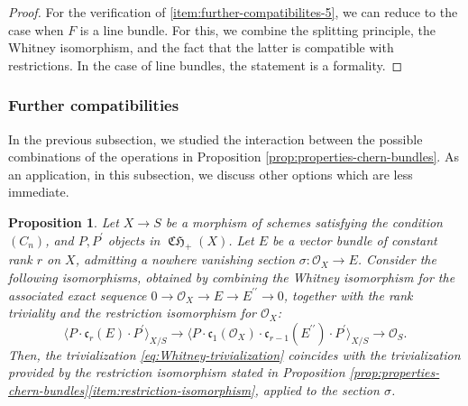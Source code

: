 \documentclass[11pt]{article}
\theoremstyle{plain}
\newtheorem{proposition}[theorem]{Proposition}
\theoremstyle{definition}
\newcommand{\Ocal}{\mathcal O}
\newcommand{\cfrak}{\mathfrak c}
\newcommand{\bis}{\prime\prime}
\DeclareMathOperator{\CHfrak}{\mathfrak{CH}}
\begin{document}
\begin{proof}
For the verification of \eqref{item:further-compatibilites-5}, we can reduce to the case when $F$ is a line bundle. For this, we combine the splitting principle, the Whitney isomorphism, and the fact that the latter is compatible with restrictions. In the case of line bundles, the statement is a formality.
\end{proof}

\subsubsection{Further compatibilities}

In the previous subsection, we studied the interaction between the possible combinations of the operations in Proposition \ref{prop:properties-chern-bundles}. As an application, in this subsection, we discuss other options which are less immediate.
\begin{proposition}\label{prop:newranktriviality}
Let $X\to S$ be a morphism of schemes satisfying the condition $(C_{n})$, and $P,P^{\prime}$ objects in $\CHfrak_{+}(X)$. Let $E$ be a vector bundle of constant rank $r$ on $X$, admitting a nowhere vanishing section $\sigma\colon\Ocal_{X}\to E$. Consider the following isomorphisms, obtained by combining the Whitney isomorphism for the associated exact sequence $0\to\Ocal_{X}\to E\to E^{\bis}\to 0$, together with the rank triviality and the restriction isomorphism for $\Ocal_{X}$:
\begin{equation}\label{eq:Whitney-trivialization}
\langle P\cdot\cfrak_{r}(E)\cdot P^{\prime}\rangle_{X/S}\to\langle P\cdot\cfrak_{1}(\Ocal_{X})\cdot\cfrak_{r-1}(E^{\bis})\cdot P^{\prime}\rangle_{X/S}\to\Ocal_{S}.
\end{equation}Then, the trivialization \eqref{eq:Whitney-trivialization} coincides with the trivialization provided by the restriction isomorphism stated in Proposition \ref{prop:properties-chern-bundles}\eqref{item:restriction-isomorphism}, applied to the section $\sigma$.
\end{proposition}
\end{document}
